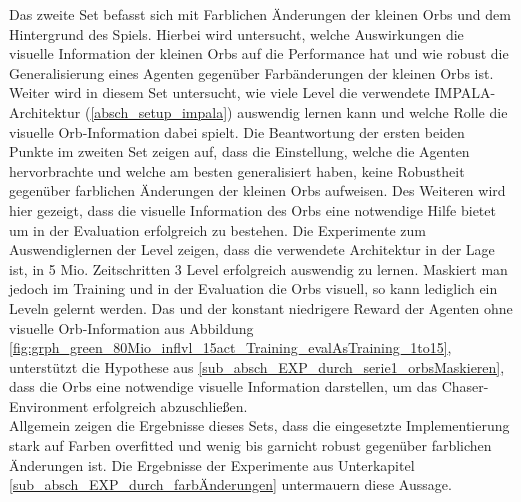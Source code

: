 Das zweite Set befasst sich mit Farblichen Änderungen der kleinen Orbs und dem Hintergrund des Spiels. Hierbei wird untersucht, welche Auswirkungen die visuelle Information der kleinen Orbs auf die Performance hat und wie robust die Generalisierung eines Agenten gegenüber Farbänderungen der kleinen Orbs ist. Weiter wird in diesem Set untersucht, wie viele Level die verwendete IMPALA-Architektur (\ref{absch_setup_impala}) auswendig lernen kann und welche Rolle die visuelle Orb-Information dabei spielt. Die Beantwortung der ersten beiden Punkte im zweiten Set zeigen auf, dass die Einstellung, welche die Agenten hervorbrachte und welche am besten generalisiert haben, keine Robustheit gegenüber farblichen Änderungen der kleinen Orbs aufweisen. Des Weiteren wird hier gezeigt, dass die visuelle Information des Orbs eine notwendige Hilfe bietet um in der Evaluation erfolgreich zu bestehen. Die Experimente zum Auswendiglernen der Level zeigen, dass die verwendete Architektur in der Lage ist, in 5 Mio. Zeitschritten 3 Level erfolgreich auswendig zu lernen. Maskiert man jedoch im Training und in der Evaluation die Orbs visuell, so kann lediglich ein Leveln gelernt werden. Das und der konstant niedrigere Reward der Agenten ohne visuelle Orb-Information aus Abbildung \ref{fig:grph_green_80Mio_inflvl_15act_Training_evalAsTraining_1to15}, unterstützt die Hypothese aus \ref{sub_absch_EXP_durch_serie1_orbsMaskieren}, dass die Orbs eine notwendige visuelle Information darstellen, um das Chaser-Environment erfolgreich abzuschließen. \\
Allgemein zeigen die Ergebnisse dieses Sets, dass die eingesetzte Implementierung stark auf Farben overfitted und wenig bis garnicht robust gegenüber farblichen Änderungen ist. Die Ergebnisse der Experimente aus Unterkapitel \ref{sub_absch_EXP_durch_farbÄnderungen} untermauern diese Aussage. 

